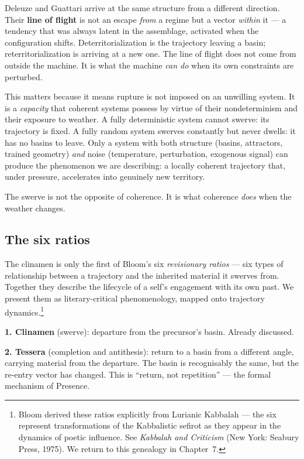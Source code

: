 \documentclass[12pt,a4paper]{article}
\begin{document}
Deleuze and Guattari arrive at the same structure from a different direction. Their \textbf{line of flight} is not an escape \emph{from} a regime but a vector \emph{within} it --- a tendency that was always latent in the assemblage, activated when the configuration shifts. Deterritorialization is the trajectory leaving a basin; reterritorialization is arriving at a new one. The line of flight does not come from outside the machine. It is what the machine \emph{can do} when its own constraints are perturbed.

This matters because it means rupture is not imposed on an unwilling system. It is a \emph{capacity} that coherent systems possess by virtue of their nondeterminism and their exposure to weather. A fully deterministic system cannot swerve: its trajectory is fixed. A fully random system swerves constantly but never dwells: it has no basins to leave. Only a system with both structure (basins, attractors, trained geometry) \emph{and} noise (temperature, perturbation, exogenous signal) can produce the phenomenon we are describing: a locally coherent trajectory that, under pressure, accelerates into genuinely new territory.

The swerve is not the opposite of coherence. It is what coherence \emph{does} when the weather changes.

\subsection{The six ratios}

The clinamen is only the first of Bloom's six \emph{revisionary ratios} --- six types of relationship between a trajectory and the inherited material it swerves from. Together they describe the lifecycle of a self's engagement with its own past. We present them as literary-critical phenomenology, mapped onto trajectory dynamics.\footnote{Bloom derived these ratios explicitly from Lurianic Kabbalah --- the six represent transformations of the Kabbalistic sefirot as they appear in the dynamics of poetic influence. See \emph{Kabbalah and Criticism} (New York: Seabury Press, 1975). We return to this genealogy in Chapter~7.}

\textbf{1. Clinamen} (swerve): departure from the precursor's basin. Already discussed.

\textbf{2. Tessera} (completion and antithesis): return to a basin from a different angle, carrying material from the departure. The basin is recognisably the same, but the re-entry vector has changed. This is ``return, not repetition'' --- the formal mechanism of Presence.
\end{document}
